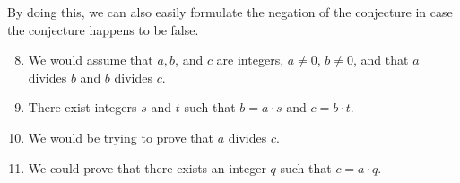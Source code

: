 By doing this, we can also easily formulate the negation of the conjecture in case the conjecture happens to be false.


\begin{enumerate} \setcounter{enumi}{7} %
  \item We would assume that $a, b$, and $c$ are integers, $a \ne 0$, $b \ne 0$, and that $a$ divides $b$ and 
        $b$ divides $c$.
  \item There exist integers $s$ and $t$ such that $b = a \cdot s$ and $c = b \cdot t$.
  \item We would be trying to prove that $a$ divides $c$.
  \item We could prove that there exists an integer $q$ such that  $c = a \cdot q$.
\end{enumerate}

\hbreak





